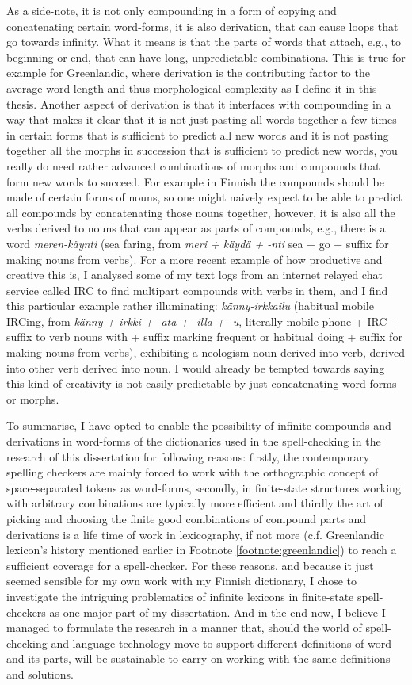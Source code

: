 \documentclass[officiallayout,final]{unihelcompling}
\begin{document}
As a side-note, it is not only compounding in a form of copying and
concatenating certain word-forms, it is also derivation, that can cause loops
that go towards infinity. What it means is that the parts of words that attach,
e.g., to beginning or end, that can have long, unpredictable combinations. This
is true for example for Greenlandic, where derivation is the contributing
factor to the average word length and thus \gls{morphological complexity} as I
define it in this thesis.  Another aspect of derivation is that it interfaces
with compounding in a way that makes it clear that it is not just pasting all
words together a few times in certain forms that is sufficient to predict
all new words and it is not pasting together all the morphs in succession that
is sufficient to predict new words, you really do need rather advanced combinations of
morphs and compounds that form new words to succeed. For example in Finnish
the compounds should be made of certain forms of nouns, so one might naively
expect to be able to predict all compounds by concatenating those nouns
together, however, it is also all the verbs derived to nouns that can appear as
parts of compounds, e.g., there is a word \emph{meren-käynti} (sea
faring, from \emph{meri + käydä + -nti} sea + go + suffix for making nouns from
verbs).  For a more recent example of how productive and creative this is, I
analysed some of my text logs from an internet relayed chat service called IRC
to find multipart compounds with verbs in them, and I find this particular
example rather illuminating: \emph{känny-irkkailu} (habitual mobile IRCing,
from \emph{känny + irkki + -ata + -illa + -u}, literally mobile phone + IRC +
suffix to verb nouns with + suffix marking frequent or habitual doing + suffix
for making nouns from verbs), exhibiting a neologism noun derived into verb,
derived into other verb derived into noun.  I would already be tempted towards
saying this kind of creativity is not easily predictable by just concatenating
word-forms or morphs.

To summarise, I have opted to enable the possibility of infinite compounds
and derivations in word-forms of the dictionaries used in the spell-checking in
the research of this dissertation for following reasons: firstly, the
contemporary spelling checkers are mainly forced to work with the orthographic
concept of space-separated tokens as word-forms, secondly, in finite-state
structures working with arbitrary combinations are typically more efficient and
thirdly the art of picking and choosing the finite good combinations of
compound parts and derivations is a life time of work in lexicography, if not
more (c.f. Greenlandic lexicon's history mentioned earlier in Footnote
\ref{footnote:greenlandic}) to reach a sufficient coverage for a spell-checker.
For these reasons, and because it just seemed sensible for my own work with my
Finnish dictionary, I chose to investigate the intriguing problematics of
infinite lexicons in finite-state spell-checkers as one major part of my
dissertation. And in the end now, I believe I managed to formulate the research
in a manner that, should the world of spell-checking and language technology
move to support different definitions of word and its parts, will be
sustainable to carry on working with the same definitions and solutions.
\end{document}

